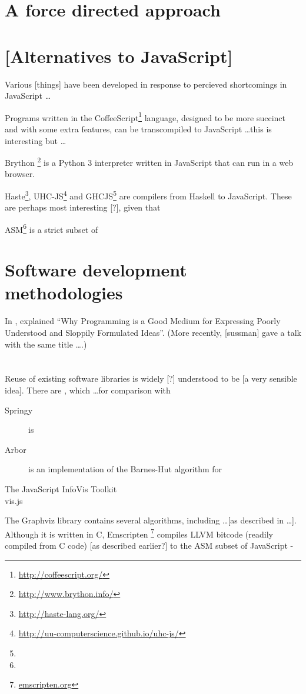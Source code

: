 \documentclass[authoryearcitations]{UoYCSproject}
\begin{document}
\section{A force directed approach}



\section{[Alternatives to JavaScript]}

Various [things] have been developed in response to percieved shortcomings in JavaScript \ldots

Programs written in the CoffeeScript\footnote{\url{http://coffeescript.org/}} language, designed to be more succinct and with some extra features, can be transcompiled to JavaScript \ldots this is interesting but \ldots

Brython \footnote{\url{http://www.brython.info/}} is a Python 3 interpreter written in JavaScript that can run in a web browser. 

Haste\footnote{\url{http://haste-lang.org/}}, UHC-JS\footnote{\url{http://uu-computerscience.github.io/uhc-js/}} and GHCJS\footnote{} are compilers from Haskell to JavaScript. These are perhaps most interesting [?], given that 


ASM\footnote{} is a strict subset of 

\section{Software development methodologies}

In \citeyear{67poorslop}, \citet*{67poorslop} explained ``Why Programming is a Good Medium for Expressing Poorly Understood and Sloppily Formulated Ideas''.
(More recently, [sussman] gave a talk with the same title \ldots {}.)


\section{}

Reuse of existing software libraries is widely [?] understood to be [a very sensible idea]. There are , which \ldots for comparison with 

\begin{description}
    \item[Springy] is
    \item[Arbor] is an implementation of the Barnes-Hut algorithm for 
    \item[The JavaScript InfoVis Toolkit]
    \item[vis.js]
\end{description}

The Graphviz library contains several algorithms, including \ldots [as described in \ldots]. Although it is written in C, Emscripten \footnote{\url{emscripten.org}} compiles LLVM bitcode (readily compiled from C code) [as described earlier?] to the ASM subset of JavaScript -



\end{document}
